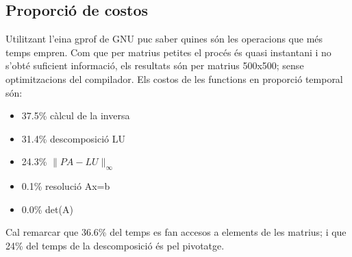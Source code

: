 \documentclass[a4paper,10pt]{article}
\begin{document}
\subsection{Proporció de costos}
Utilitzant l'eina gprof de GNU puc saber quines són les operacions que més temps empren. Com que per matrius petites el procés és quasi instantani
i no s'obté suficient informació, els resultats són per matrius 500x500; sense optimitzacions del compilador.
Els costos de les functions en proporció temporal són:
\begin{itemize}
 \item 37.5\% càlcul de la inversa
 \item 31.4\% descomposició LU
 \item 24.3\% $\|PA-LU\|_\infty$
 \item 0.1\%  resolució Ax=b
 \item 0.0\%  det(A)
\end{itemize}
Cal remarcar que 36.6\% del temps es fan accesos a elements de les matrius; i que 24\% del temps de la descomposició és pel pivotatge.
\end{document}
